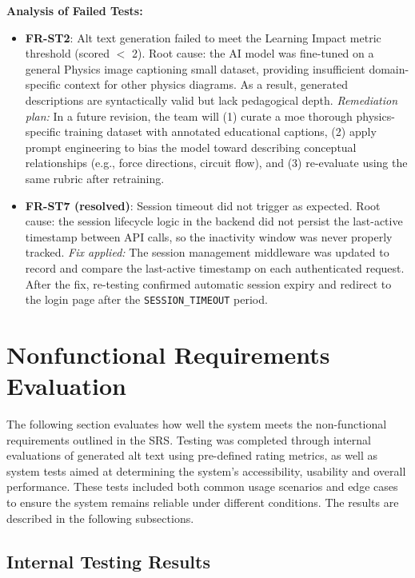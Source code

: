 \documentclass[12pt, titlepage]{article}
\begin{document}
\textbf{Analysis of Failed Tests:}
\begin{itemize}
  \item \textbf{FR-ST2}: Alt text generation failed to meet the
    Learning Impact metric threshold (scored $<$ 2). Root cause: the
    AI model was fine-tuned on a general Physics image captioning small dataset,
    providing insufficient domain-specific context for other physics
    diagrams. As a result, generated descriptions are syntactically
    valid but lack pedagogical depth. \textit{Remediation plan:} In a
    future revision, the team will (1) curate a moe thorough physics-specific
    training dataset with annotated educational captions, (2) apply
    prompt engineering to bias the model toward describing conceptual
    relationships (e.g., force directions, circuit flow), and (3)
    re-evaluate using the same rubric after retraining.

  \item \textbf{FR-ST7 (resolved)}: Session timeout did not trigger
    as expected. Root cause: the session lifecycle logic in the
    backend did not persist the last-active timestamp between API
    calls, so the inactivity window was never properly tracked.
    \textit{Fix applied:} The session management middleware was
    updated to record and compare the last-active timestamp on each
    authenticated request. After the fix, re-testing confirmed
    automatic session expiry and redirect to the login page after the
    \texttt{SESSION\_TIMEOUT} period.
\end{itemize}

\section{Nonfunctional Requirements Evaluation}

The following section evaluates how well the system meets the
non-functional requirements outlined in the SRS.
Testing was completed through internal evaluations of generated alt
text using pre-defined rating metrics, as well as system
tests aimed at determining the system's accessibility, usability and
overall performance.
These tests included both common usage scenarios and edge cases to
ensure the system remains reliable under different conditions.
The results are described in the following subsections.

\subsection{Internal Testing Results}
\end{document}
